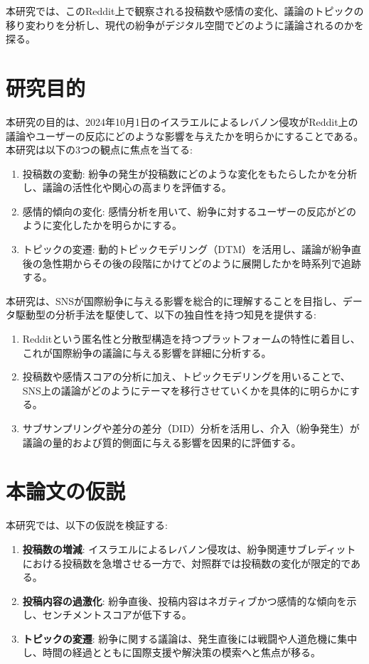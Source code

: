 \documentclass[11pt, a4j]{jreport}
\begin{document}
    本研究では、このReddit上で観察される投稿数や感情の変化、議論のトピックの移り変わりを分析し、現代の紛争がデジタル空間でどのように議論されるのかを探る。

    \section{研究目的}
    本研究の目的は、2024年10月1日のイスラエルによるレバノン侵攻がReddit上の議論やユーザーの反応にどのような影響を与えたかを明らかにすることである。本研究は以下の3つの観点に焦点を当てる: 

    \begin{enumerate}
        \item 投稿数の変動: 紛争の発生が投稿数にどのような変化をもたらしたかを分析し、議論の活性化や関心の高まりを評価する。
        \item 感情的傾向の変化: 感情分析を用いて、紛争に対するユーザーの反応がどのように変化したかを明らかにする。
        \item トピックの変遷: 動的トピックモデリング（DTM）を活用し、議論が紛争直後の急性期からその後の段階にかけてどのように展開したかを時系列で追跡する。
    \end{enumerate}

    本研究は、SNSが国際紛争に与える影響を総合的に理解することを目指し、データ駆動型の分析手法を駆使して、以下の独自性を持つ知見を提供する: 

    \begin{enumerate}
        \item Redditという匿名性と分散型構造を持つプラットフォームの特性に着目し、これが国際紛争の議論に与える影響を詳細に分析する。
        \item 投稿数や感情スコアの分析に加え、トピックモデリングを用いることで、SNS上の議論がどのようにテーマを移行させていくかを具体的に明らかにする。
        \item サブサンプリングや差分の差分（DID）分析を活用し、介入（紛争発生）が議論の量的および質的側面に与える影響を因果的に評価する。
    \end{enumerate}

    \section{本論文の仮説}
    本研究では、以下の仮説を検証する: 
    \begin{enumerate}
        \item \textbf{投稿数の増減}: イスラエルによるレバノン侵攻は、紛争関連サブレディットにおける投稿数を急増させる一方で、対照群では投稿数の変化が限定的である。
        \item \textbf{投稿内容の過激化}: 紛争直後、投稿内容はネガティブかつ感情的な傾向を示し、センチメントスコアが低下する。
        \item \textbf{トピックの変遷}: 紛争に関する議論は、発生直後には戦闘や人道危機に集中し、時間の経過とともに国際支援や解決策の模索へと焦点が移る。
    \end{enumerate}
\end{document}
